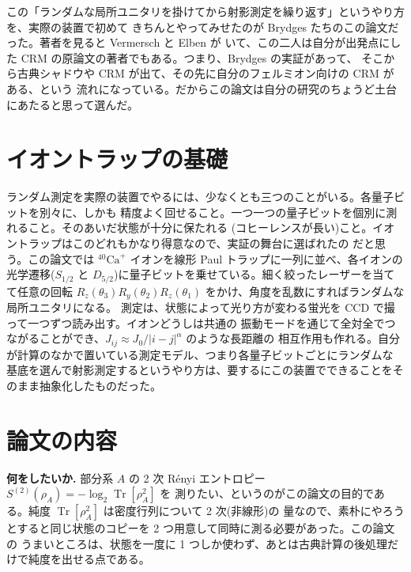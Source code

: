 \documentclass[10pt,a4paper,twocolumn]{ltjsarticle}
\newcommand{\Tr}{\operatorname{Tr}}
\begin{document}
この「ランダムな局所ユニタリを掛けてから射影測定を繰り返す」というやり方を、実際の装置で初めて
きちんとやってみせたのが Brydges たちのこの論文\cite{brydges}だった。著者を見ると Vermersch と Elben が
いて、この二人は自分が出発点にした CRM の原論文の著者でもある。つまり、Brydges の実証があって、
そこから古典シャドウ\cite{shadow}や CRM が出て、その先に自分のフェルミオン向けの CRM がある、という
流れになっている。だからこの論文は自分の研究のちょうど土台にあたると思って選んだ。

\section{イオントラップの基礎}
ランダム測定を実際の装置でやるには、少なくとも三つのことがいる。各量子ビットを別々に、しかも
精度よく回せること。一つ一つの量子ビットを個別に測れること。そのあいだ状態が十分に保たれる
(コヒーレンスが長い)こと。イオントラップはこのどれもかなり得意なので、実証の舞台に選ばれたの
だと思う。この論文では ${}^{40}\mathrm{Ca}^{+}$ イオンを線形 Paul トラップに一列に並べ、各イオンの
光学遷移($S_{1/2}$ と $D_{5/2}$)に量子ビットを乗せている。細く絞ったレーザーを当てて任意の回転
$R_z(\theta_3)R_y(\theta_2)R_z(\theta_1)$ をかけ、角度を乱数にすればランダムな局所ユニタリになる。
測定は、状態によって光り方が変わる蛍光を CCD で撮って一つずつ読み出す。イオンどうしは共通の
振動モードを通じて全対全でつながることができ、$J_{ij}\approx J_0/|i-j|^\alpha$ のような長距離の
相互作用も作れる。自分が計算のなかで置いている測定モデル、つまり各量子ビットごとにランダムな
基底を選んで射影測定するというやり方は、要するにこの装置でできることをそのまま抽象化したものだった。

\section{論文の内容}
\textbf{何をしたいか.} 部分系 $A$ の 2 次 R\'enyi エントロピー $S^{(2)}(\rho_A)=-\log_2\Tr[\rho_A^2]$ を
測りたい、というのがこの論文の目的である。純度 $\Tr[\rho_A^2]$ は密度行列について 2 次(非線形)の
量なので、素朴にやろうとすると同じ状態のコピーを 2 つ用意して同時に測る必要があった。この論文の
うまいところは、状態を一度に 1 つしか使わず、あとは古典計算の後処理だけで純度を出せる点である。
\end{document}
